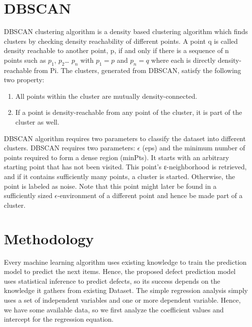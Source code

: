 \documentclass[12pt]{report}
\begin{document}
\section{DBSCAN}
 
DBSCAN clustering algorithm is a density based clustering algorithm which finds clusters by checking density reachability of different points. A point q is called density reachable to another point, p, if and only if there is a sequence of n points such as $p_{1}$, $p_{2}$… $p_{n}$ with $p_{1}=p$ and $p_{n}=q$ where each   is directly density-reachable from Pi. The clusters, generated from DBSCAN, satisfy the following two property:
\begin{enumerate}
	\item {All points within the cluster are mutually density-connected.}
	\item {If a point is density-reachable from any point of the cluster, it is part of the cluster as well.}
\end{enumerate}
	
DBSCAN algorithm requires two parameters to classify the dataset into different clusters. DBSCAN requires two parameters: $\epsilon$ (eps) and the minimum number of points required to form a dense region (minPts). It starts with an arbitrary starting point that has not been visited. This point's ε-neighborhood is retrieved, and if it contains sufficiently many points, a cluster is started. Otherwise, the point is labeled as noise. Note that this point might later be found in a sufficiently sized $\epsilon$-environment of a different point and hence be made part of a cluster.

\section{Methodology}
Every machine learning algorithm uses existing knowledge to train the prediction model to predict the next items. Hence, the proposed defect prediction model uses statistical inference to predict defects, so its success depends on the knowledge it gathers from existing Dataset.
The simple regression analysis simply uses a set of independent variables and one or more dependent variable. Hence, we have some available data, so we first analyze the coefficient values and intercept for the regression equation.
\end{document}
